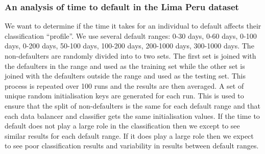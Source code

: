 \documentclass{sig-alternate-05-2015}
\begin{document}
	\subsubsection{An analysis of time to default in the Lima Peru dataset}
	We want to determine if the time it takes for an individual to default affects their classification ``profile''. We use several default ranges: 0-30 days, 0-60 days, 0-100 days, 0-200 days, 50-100 days, 100-200 days, 200-1000 days, 300-1000 days. The non-defaulters are randomly divided into to two sets. The first set is joined with the defaulters in the range and used as the training set while the other set is joined with the defaulters outside the range and used as the testing set. This process is repeated over 100 runs and the results are then averaged. A set of unique random initialisation keys are generated for each run. This is used to ensure that the split of non-defaulters is the same for each default range and that each data balancer and classifier gets the same initialisation values. If the time to default does not play a large role in the classification then we except to see similar results for each default range. If it does play a large role then we expect to see poor classification results and variability in results between default ranges.
	
\end{document}
